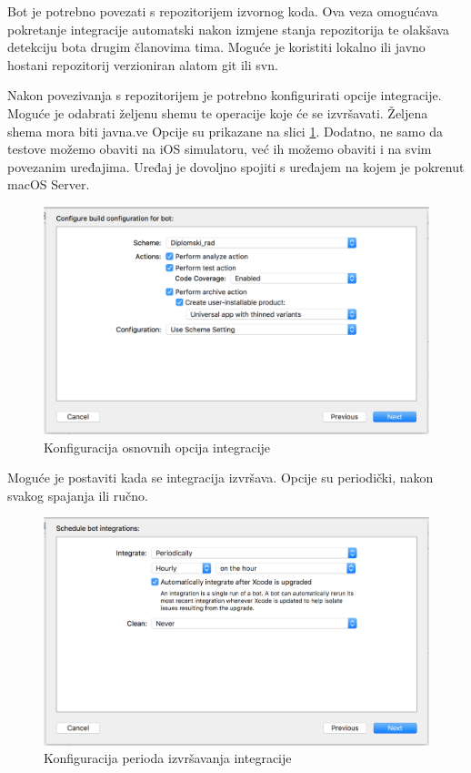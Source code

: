 \documentclass[times, utf8, diplomski, numeric]{fer}
\begin{document}
\begin{appendices}
Bot je potrebno povezati s repozitorijem izvornog koda. Ova veza omogućava pokretanje integracije automatski nakon izmjene stanja repozitorija te olakšava detekciju bota drugim članovima tima. Moguće je koristiti lokalno ili javno hostani repozitorij verzioniran alatom git ili svn.

Nakon povezivanja s repozitorijem je potrebno konfigurirati opcije integracije. Moguće je odabrati željenu shemu te operacije koje će se izvršavati. Željena shema mora biti javna.ve Opcije su prikazane na slici \ref{fig:XcodeServerOptions}. Dodatno, ne samo da testove možemo obaviti na iOS simulatoru, već ih možemo obaviti i na svim povezanim uređajima. Uređaj je dovoljno spojiti s uređajem na kojem je pokrenut macOS Server.

\begin{figure}
    \centering
    \includegraphics[scale=0.5]{XcodeServerOptions}
    \caption{Konfiguracija osnovnih opcija integracije}
    \label{fig:XcodeServerOptions}
\end{figure}

Moguće je postaviti kada se integracija izvršava. Opcije su periodički, nakon svakog spajanja ili ručno.

\begin{figure}
    \centering
    \includegraphics[scale=0.5]{XcodeServerIntegrationPeriods}
    \caption{Konfiguracija perioda izvršavanja integracije}
    \label{fig:XcodeServerIntegrationPeriods}
\end{figure}


\end{appendices}
\end{document}
